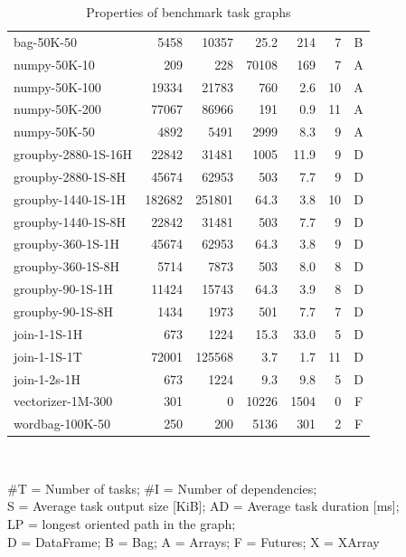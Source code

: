 \begin{table}[h]
\begin{tabular}{l|rrrrrc}
		bag-50K-50          & \num{5458}         & \num{10357}              & 25.2       & 214   & 7  & B \\
		numpy-50K-10        & \num{209}          & \num{228}                & \num{70108}      & 169   & 7  & A \\
		numpy-50K-100       & \num{19334}        & \num{21783}              & 760        & 2.6   & 10 & A \\
		numpy-50K-200       & \num{77067}        & \num{86966}              & 191        & 0.9   & 11 & A \\
		numpy-50K-50        & \num{4892}         & \num{5491}               & \num{2999}       & 8.3   & 9  & A \\
		groupby-2880-1S-16H & \num{22842}        & \num{31481}              & \num{1005}       & 11.9  & 9  & D \\
		groupby-2880-1S-8H  & \num{45674}        & \num{62953}              & 503        & 7.7   & 9  & D \\
		groupby-1440-1S-1H  & \num{182682}       & \num{251801}             & 64.3       & 3.8   & 10 & D \\
		groupby-1440-1S-8H  & \num{22842}        & \num{31481}              & 503        & 7.7   & 9  & D \\
		groupby-360-1S-1H   & \num{45674}        & \num{62953}              & 64.3       & 3.8   & 9  & D \\
		groupby-360-1S-8H   & \num{5714}         & \num{7873}               & 503        & 8.0   & 8  & D \\
		groupby-90-1S-1H    & \num{11424}        & \num{15743}              & 64.3       & 3.9   & 8  & D \\
		groupby-90-1S-8H    & \num{1434}         & \num{1973}               & 501        & 7.7   & 7  & D \\
		join-1-1S-1H        & \num{673}          & \num{1224}               & 15.3       & 33.0  & 5  & D \\
		join-1-1S-1T        & \num{72001}        & \num{125568}             & 3.7        & 1.7   & 11 & D \\
		join-1-2s-1H        & \num{673}          & \num{1224}               & 9.3        & 9.8   & 5  & D \\
		vectorizer-1M-300   & \num{301}          & \num{0}                  & \num{10226}      & \num{1504}  & 0  & F \\
		wordbag-100K-50     & \num{250}          & \num{200}                & \num{5136}       & 301   & 2  & F \\
		\bottomrule
	\end{tabular}\\
	\vspace{1mm}

	\#T = Number of tasks; \#I = Number of dependencies; \\
	S = Average task output size [KiB]; AD = Average task
	duration [ms]; \\ LP = longest oriented path in the graph; \\ D = DataFrame; B =
	Bag; A = Arrays; F = Futures; X = XArray \caption{Properties of \dask{} benchmark task graphs} \label{tab:dask-graph-properties}
\end{table}

